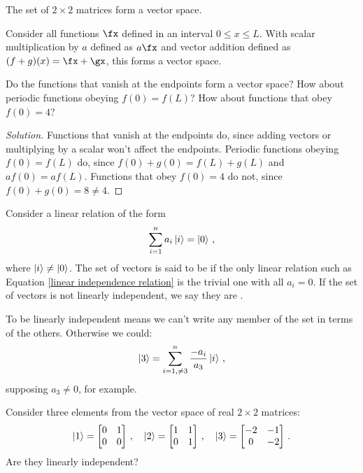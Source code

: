 \begin{example}
The set of $2 \times 2$ matrices form a vector space.
\end{example}

\begin{example}
Consider all functions $\fx$ defined in an interval $0 \leq x \leq L$. With scalar multiplication by $a$ defined as $a\fx$ and vector addition defined as $(f + g)(x) = \fx + \gx$, this forms a vector space.
\end{example}

\begin{exercise}
Do the functions that vanish at the endpoints form a vector space? How about periodic functions obeying $f(0) = f(L)$? How about functions that obey $f(0) = 4$?
\end{exercise}

\begin{proof}[Solution]
Functions that vanish at the endpoints do, since adding vectors or multiplying by a scalar won't affect the endpoints. Periodic functions obeying $f(0) = f(L)$ do, since $f(0) + g(0) = f(L) + g(L)$ and $af(0) = af(L)$. Functions that obey $f(0) = 4$ do not, since $f(0) + g(0) = 8 \neq 4$.
\end{proof}

\begin{shaded*}
Consider a linear relation of the form
\begin{equation}\label{linear independence relation}
    \sum_{i = 1}^n a_i \ket{i} = \ket{0}\,,
\end{equation}
where $\ket{i} \neq \ket{0}$. The set of vectors is said to be  if the only linear relation such as Equation \eqref{linear independence relation} is the trivial one with all $a_i = 0$. If the set of vectors is not linearly independent, we say they are .
\end{shaded*}

To be linearly independent means we can't write any member of the set in terms of the others. Otherwise we could:
\[ \ket{3} = \sum_{i = 1, \neq 3}^n \frac{-a_i}{a_3}\ket{i}\,, \]
supposing $a_3 \neq 0$, for example.

\begin{exercise}
Consider three elements from the vector space of real $2 \times 2$ matrices:
\[
\ket{1} = 
\begin{bmatrix}
0 & 1 \\
0 & 0
\end{bmatrix}\,,
\quad
\ket{2} = 
\begin{bmatrix}
1 & 1 \\
0 & 1
\end{bmatrix}\,,
\quad
\ket{3} = 
\begin{bmatrix}
-2 & -1 \\
0  & -2
\end{bmatrix}\,.
\]
Are they linearly independent?
\end{exercise}

